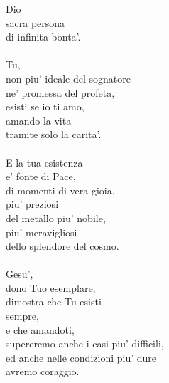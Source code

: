 \begin{haiku}
Dio\\
sacra persona\\
di infinita bonta'.\\
\leavevmode\\
Tu,\\
non piu' ideale del sognatore\\
ne' promessa del profeta,\\
esisti se io ti amo,\\
amando la vita\\
tramite solo la carita'.\\
\leavevmode\\
E la tua esistenza\\
e' fonte di Pace,\\
di momenti di vera gioia,\\
piu' preziosi\\
del metallo piu' nobile,\\
piu' meravigliosi\\
dello splendore del cosmo.\\
\leavevmode\\
Gesu',\\
dono Tuo esemplare,\\
dimostra che Tu esisti\\
sempre,\\
e che amandoti,\\
supereremo anche i casi piu' difficili,\\
ed anche nelle condizioni piu' dure\\
avremo coraggio.\\
\end{haiku}

